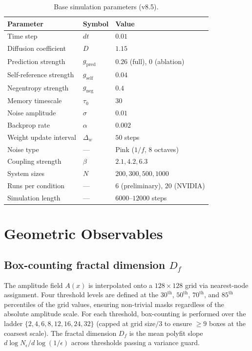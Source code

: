 \documentclass[12pt,a4paper]{article}
\theoremstyle{plain}
\theoremstyle{definition}
\begin{document}
\begin{table}[H]
\centering
\caption{Base simulation parameters (v8.5).}
\label{tab:params}
\begin{tabular}{lll}
\toprule
Parameter & Symbol & Value \\
\midrule
Time step & $dt$ & $0.01$ \\
Diffusion coefficient & $D$ & $1.15$ \\
Prediction strength & $g_{\text{pred}}$ & $0.26$ (full), $0$ (ablation) \\
Self-reference strength & $g_{\text{self}}$ & $0.04$ \\
Negentropy strength & $g_{\text{neg}}$ & $0.4$ \\
Memory timescale & $\tau_0$ & $30$ \\
Noise amplitude & $\sigma$ & $0.01$ \\
Backprop rate & $\alpha$ & $0.002$ \\
Weight update interval & $\Delta_w$ & $50$ steps \\
Noise type & --- & Pink ($1/f$, 8 octaves) \\
Coupling strength & $\beta$ & $2.1, 4.2, 6.3$ \\
System sizes & $N$ & $200, 300, 500, 1000$ \\
Runs per condition & --- & $6$ (preliminary), $20$ (NVIDIA) \\
Simulation length & --- & $6000$--$12000$ steps \\
\bottomrule
\end{tabular}
\end{table}

\section{Geometric Observables}
\label{sec:metrics}

\subsection{Box-counting fractal dimension \texorpdfstring{$D_f$}{Df}}

The amplitude field $A(x)$ is interpolated onto a $128 \times 128$ grid
via nearest-node assignment. Four threshold levels are defined at the
$30^{\text{th}}$, $50^{\text{th}}$, $70^{\text{th}}$, and $85^{\text{th}}$
percentiles of the grid values, ensuring non-trivial masks regardless
of the absolute amplitude scale. For each threshold, box-counting is
performed over the ladder $\{2, 4, 6, 8, 12, 16, 24, 32\}$ (capped at
grid size$/3$ to ensure $\geq 9$ boxes at the coarsest scale). The
fractal dimension $D_f$ is the mean polyfit slope $d\log N_\epsilon /
d\log(1/\epsilon)$ across thresholds passing a variance guard.
\end{document}
